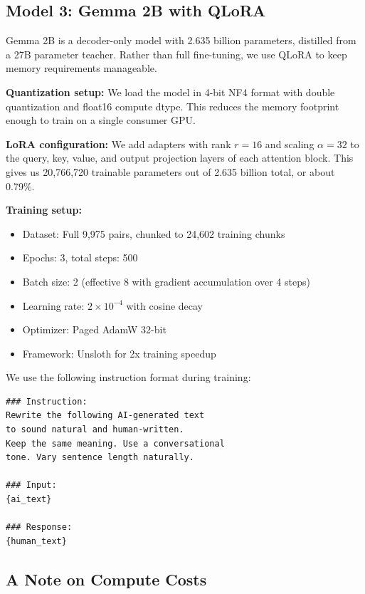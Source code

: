 \documentclass{article}
\begin{document}
\subsection{Model 3: Gemma 2B with QLoRA}

Gemma 2B \cite{google2024gemma} is a decoder-only model with 2.635 billion parameters, distilled from a 27B parameter teacher. Rather than full fine-tuning, we use QLoRA \cite{dettmers2023qlora} to keep memory requirements manageable.

\textbf{Quantization setup:} We load the model in 4-bit NF4 format with double quantization and float16 compute dtype. This reduces the memory footprint enough to train on a single consumer GPU.

\textbf{LoRA configuration:} We add adapters with rank $r = 16$ and scaling $\alpha = 32$ to the query, key, value, and output projection layers of each attention block. This gives us 20,766,720 trainable parameters out of 2.635 billion total, or about 0.79\%.

\textbf{Training setup:}
\begin{itemize}[noitemsep]
    \item Dataset: Full 9,975 pairs, chunked to 24,602 training chunks
    \item Epochs: 3, total steps: 500
    \item Batch size: 2 (effective 8 with gradient accumulation over 4 steps)
    \item Learning rate: $2 \times 10^{-4}$ with cosine decay
    \item Optimizer: Paged AdamW 32-bit
    \item Framework: Unsloth for 2x training speedup
\end{itemize}

We use the following instruction format during training:

\begin{verbatim}
### Instruction:
Rewrite the following AI-generated text
to sound natural and human-written.
Keep the same meaning. Use a conversational
tone. Vary sentence length naturally.

### Input:
{ai_text}

### Response:
{human_text}
\end{verbatim}

\subsection{A Note on Compute Costs}
\end{document}
